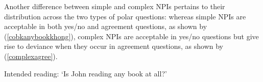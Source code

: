 \documentclass[output=paper,colorlinks,citecolor=brown]{langscibook}
\begin{document}
Another difference between simple and complex NPIs pertains to their distribution across the two types of polar questions: whereas simple NPIs are acceptable in both yes/no and agreement questions, as shown by (\ref{cobkanybookkhong}), complex NPIs are acceptable in yes/no questions but give rise to deviance when they occur in agreement questions, as shown by (\ref{complexagree}).

\ea Intended reading: `Is John reading any book at all?'
\label{cobkanybookkhong}
\label{complexagree}
\z
\z



\end{document}

